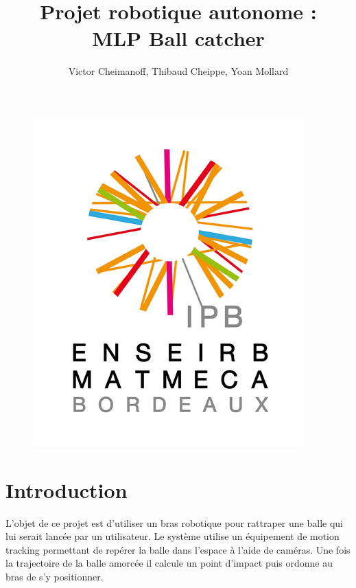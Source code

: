 \documentclass{article}[11pt]
\begin{document}
\Large

\title{Projet robotique autonome :\\ \textbf{MLP Ball catcher}}

\author{Victor Cheimanoff, Thibaud Cheippe, Yoan Mollard}

\maketitle

\normalsize

\tableofcontents

\begin{figure}[!htc]
	\begin{center}
		\includegraphics[scale=0.3]{images/logo_enseirb.png}
	\end{center}
\end{figure}

\newpage

\section{Introduction}

L'objet de ce projet est d'utiliser un bras robotique pour rattraper une balle qui lui serait lancée par un utilisateur. Le système utilise un équipement de motion tracking permettant de repérer la balle dans l'espace à l'aide de caméras. Une fois la trajectoire de la balle amorcée il calcule un point d'impact puis ordonne au bras de s'y positionner. \\
\end{document}
